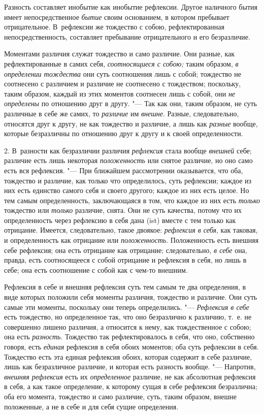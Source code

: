 Разность составляет инобытие как инобытие рефлексии. Другое наличного бытия
имеет непосредственное {\em бытие} своим основанием, в
котором пребывает отрицательное. В~рефлексии же тождество с собою,
рефлектированная непосредственность, составляет пребывание отрицательного и
его безразличие.

Моментами различия служат тождество и само различие. Они разные, как
рефлектированные в самих себя, {\em соотносящиеся с
собою;} таким образом, {\em в определении тождества}
они суть соотношения лишь с собой; тождество не соотнесено с различием и
различие не соотнесено с тождеством; поскольку, таким образом, каждый из
этих моментов соотнесен лишь с собой, они {\em не
определены} по отношению друг в другу. "--- Так как они, таким образом, не
суть различные в себе же самих, то {\em различие} им
{\em внешне}. Разные, следовательно, относятся друг к
другу, не как тождество и различие, а лишь как
{\em разные} вообще, которые безразличны по отношению
друг к другу и к своей определенности.

2. В~разности как безразличии различия {\em рефлексия}
стала вообще {\em внешней} себе; различие есть лишь
некоторая {\em положенность} или снятое различие, но
оно само есть вся рефлексия. "--- При ближайшем рассмотрении оказывается, что
оба, тождество и различие, как только что определилось, суть рефлексии;
каждое из них есть единство самого себя и своего другого; каждое из них
есть целое. Но тем самым определенность, заключающаяся в том, что каждое из
них есть {\em только} тождество или
{\em только} различие, снята. Они не суть качества,
потому что их определенность через рефлексию в себя дана (ist) вместе с тем
только как отрицание. Имеется, следовательно, такое двоякое:
{\em рефлексия в себя}, как таковая, и определенность
как отрицание или {\em положенность}. Положенность есть
внешняя себе рефлексия; она есть отрицание как отрицание; следовательно,
{\em в себе} она, правда, есть соотносящееся с собой
отрицание и рефлексия в себя, но лишь в себе; она есть соотношение с собой
как с чем-то внешним.

Рефлексия в себе и внешняя рефлексия суть тем самым те два определения, в
виде которых положили себя моменты различия, тождество и различие. Они суть
самые эти моменты, поскольку они теперь определились. "---
{\em Рефлексия в себе} есть тождество, но определенное
так, что оно безразлично к различию, т.~е. не совершенно лишено различия, а
относится к нему, как тождественное с собою; она есть
{\em разность}. Тождество так рефлектировалось в себя,
что оно, собственно говоря, есть {\em единая} рефлексия
в себя обоих моментов; оба суть рефлексии в себя. Тождество есть эта единая
рефлексия обоих, которая содержит в себе различие, лишь как безразличное
различие, и которая есть разность вообще. "--- Напротив,
{\em внешняя рефлексия} есть их
{\em определенное} различие, не как абсолютная
рефлексия в себя, а как такое определение, к которому сущая в себе
рефлексия безразлична; оба его момента, тождество и само различие, суть,
таким образом, внешне положенные, а не в себе и для себя сущие определения.

